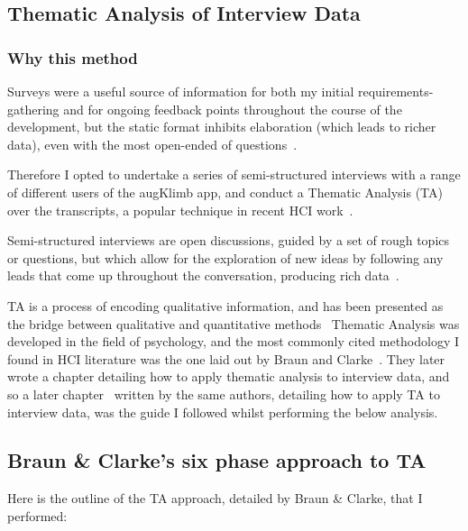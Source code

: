 \subsection{Thematic Analysis of Interview Data}
\subsubsection{Why this method}
Surveys were a useful source of information for both my initial requirements-gathering and for ongoing feedback points throughout the course of the development, but the static format inhibits elaboration (which leads to richer data), even with the most open-ended of questions~\cite{ozoksurvey}.

Therefore I opted to undertake a series of semi-structured interviews with a range of different users of the augKlimb app, and conduct a Thematic Analysis (TA) over the transcripts, a popular technique in recent HCI work~\cite{themanbrown}.

Semi-structured interviews are open discussions, guided by a set of rough topics or questions, but which allow for the exploration of new ideas by following any leads that come up throughout the conversation, producing rich data~\cite{oro11911}.

TA is a process of encoding qualitative information, and has been presented as the bridge between qualitative and quantitative methods~\cite{boyatzis1998transforming}
Thematic Analysis was developed in the field of psychology, and the most commonly cited methodology I found in HCI literature was the one laid out by Braun and Clarke~\cite{braunclarke06}.
They later wrote a chapter detailing how to apply thematic analysis to interview data, and so a later chapter~\cite{brauminterviewta} written by the same authors, detailing how to apply TA to interview data, was the guide I followed whilst performing the below analysis.

\clearpage
\subsection{Braun \& Clarke’s six phase approach to TA}
Here is the outline of the TA approach, detailed by Braun \& Clarke, that I performed:

